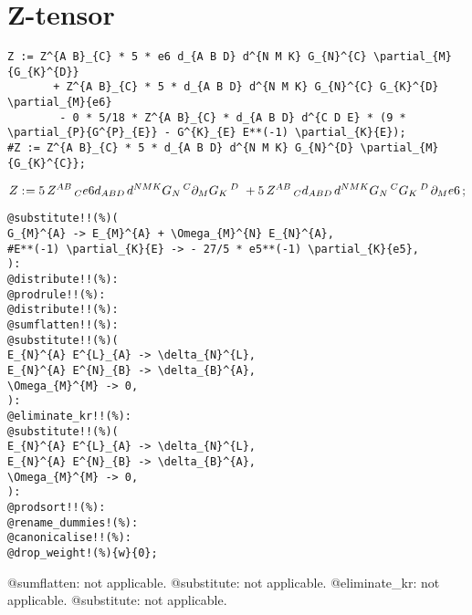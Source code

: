 \documentclass[11pt]{article}
\def\specialcolon{\mathrel{\mathop{:}}\hspace{-.5em}}
\begin{document}
\section*{Z-tensor}
{\color[named]{Blue}\begin{verbatim}
Z := Z^{A B}_{C} * 5 * e6 d_{A B D} d^{N M K} G_{N}^{C} \partial_{M}{G_{K}^{D}} 
       + Z^{A B}_{C} * 5 * d_{A B D} d^{N M K} G_{N}^{C} G_{K}^{D} \partial_{M}{e6} 
        - 0 * 5/18 * Z^{A B}_{C} * d_{A B D} d^{C D E} * (9 * \partial_{P}{G^{P}_{E}} - G^{K}_{E} E**(-1) \partial_{K}{E});
#Z := Z^{A B}_{C} * 5 * d_{A B D} d^{N M K} G_{N}^{D} \partial_{M}{G_{K}^{C}};
\end{verbatim}}
\begin{dmath*}[compact, spread=2pt]
Z\specialcolon{}= 5\, {Z}^{A B}\,_{C} e6 {d}_{A B D\, } {d}^{N M K} {G}_{N}\,^{C} {\partial}_{M}{{G}_{K}\,^{D\, }}\,  + 5\, {Z}^{A B}\,_{C} {d}_{A B D\, } {d}^{N M K} {G}_{N}\,^{C} {G}_{K}\,^{D\, } {\partial}_{M}{e6}\, ;
\end{dmath*}
{\color[named]{Blue}\begin{verbatim}
@substitute!!(%)(
G_{M}^{A} -> E_{M}^{A} + \Omega_{M}^{N} E_{N}^{A},
#E**(-1) \partial_{K}{E} -> - 27/5 * e5**(-1) \partial_{K}{e5},
):
@distribute!!(%):
@prodrule!!(%):
@distribute!!(%):
@sumflatten!!(%):
@substitute!!(%)(
E_{N}^{A} E^{L}_{A} -> \delta_{N}^{L},
E_{N}^{A} E^{N}_{B} -> \delta_{B}^{A},
\Omega_{M}^{M} -> 0,
):
@eliminate_kr!!(%):
@substitute!!(%)(
E_{N}^{A} E^{L}_{A} -> \delta_{N}^{L},
E_{N}^{A} E^{N}_{B} -> \delta_{B}^{A},
\Omega_{M}^{M} -> 0,
):
@prodsort!!(%):
@rename_dummies!(%):
@canonicalise!!(%):
@drop_weight!(%){w}{0};
\end{verbatim}}
@sumflatten: not applicable.
@substitute: not applicable.
@eliminate\_kr: not applicable.
@substitute: not applicable.
\end{document}
